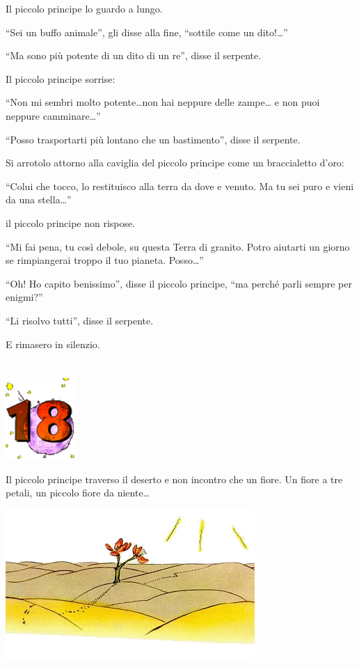 \documentclass[11pt]{scrbook}
\begin{document}
Il piccolo principe lo guardo a lungo.

``Sei un buffo animale'', gli disse alla fine, ``sottile come un
dito!\ldots{}''

``Ma sono più potente di un dito di un re'', disse il serpente.

Il piccolo principe sorrise:

``Non mi sembri molto potente\ldots{}non hai neppure delle zampe\ldots{}
e non puoi neppure camminare\ldots{}''

``Posso trasportarti più lontano che un bastimento'', disse il serpente.

Si arrotolo attorno alla caviglia del piccolo principe come un
braccialetto d'oro:

``Colui che tocco, lo restituisco alla terra da dove e venuto. Ma tu sei
puro e vieni da una stella\ldots{}''

il piccolo principe non rispose.

``Mi fai pena, tu così debole, su questa Terra di granito. Potro
aiutarti un giorno se rimpiangerai troppo il tuo pianeta.
Posso\ldots{}''

``Oh! Ho capito benissimo'', disse il piccolo principe, ``ma perché
parli sempre per enigmi?''

``Li risolvo tutti'', disse il serpente.

E rimasero in silenzio.

\chapter{}
\begin{center}
\includegraphics{./img/chapter18.png}
\end{center}

Il piccolo principe traverso il deserto e non incontro che un fiore. Un
fiore a tre petali, un piccolo fiore da niente\ldots{}

\begin{center}
\includegraphics{./img/18a.png}
\end{center}
\end{document}
